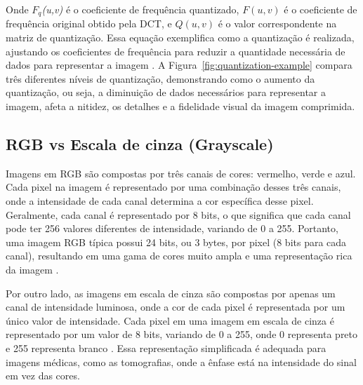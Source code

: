 \noindent Onde \textit{\(F_q\)(u,v)} é o coeficiente de frequência quantizado, $F(u,v)$ é o coeficiente de frequência original obtido pela \acrshort{DCT}, e $Q(u,v)$ é o valor correspondente na matriz de quantização. Essa equação exemplifica como a quantização é realizada, ajustando os coeficientes de frequência para reduzir a quantidade necessária de dados para  representar a imagem \cite{quantizationGersho}. A Figura~\ref{fig:quantization-example} compara três diferentes níveis de quantização, demonstrando como o aumento da quantização, ou seja, a diminuição de dados necessários para representar a imagem, afeta a nitidez, os detalhes e a fidelidade visual da imagem comprimida. 

\begin{figure}[H]
	\centering
\end{figure}

\subsection{\acrfull{RGB} vs Escala de cinza (Grayscale)}
Imagens em \acrfull{RGB} são compostas por três canais de cores: vermelho, verde e azul. Cada pixel na imagem é representado por uma combinação desses três canais, onde a intensidade de cada canal determina a cor específica desse pixel. Geralmente, cada canal é representado por 8 bits, o que significa que cada canal pode ter 256 valores diferentes de intensidade, variando de 0 a 255. Portanto, uma imagem RGB típica possui 24 bits, ou 3 bytes, por pixel (8 bits para cada canal), resultando em uma gama de cores muito ampla e uma representação rica da imagem \cite{digitalImageProcessingGonzalez}.

Por outro lado, as imagens em escala de cinza são compostas por apenas um canal de intensidade luminosa, onde a cor de cada pixel é representada por um único valor de intensidade. Cada pixel em uma imagem em escala de cinza é representado por um valor de 8 bits, variando de 0 a 255, onde 0 representa preto e 255 representa branco \cite{digitalImageProcessingGonzalez}. Essa representação simplificada é adequada para imagens médicas, como as tomografias, onde a ênfase está na intensidade do sinal em vez das cores.

